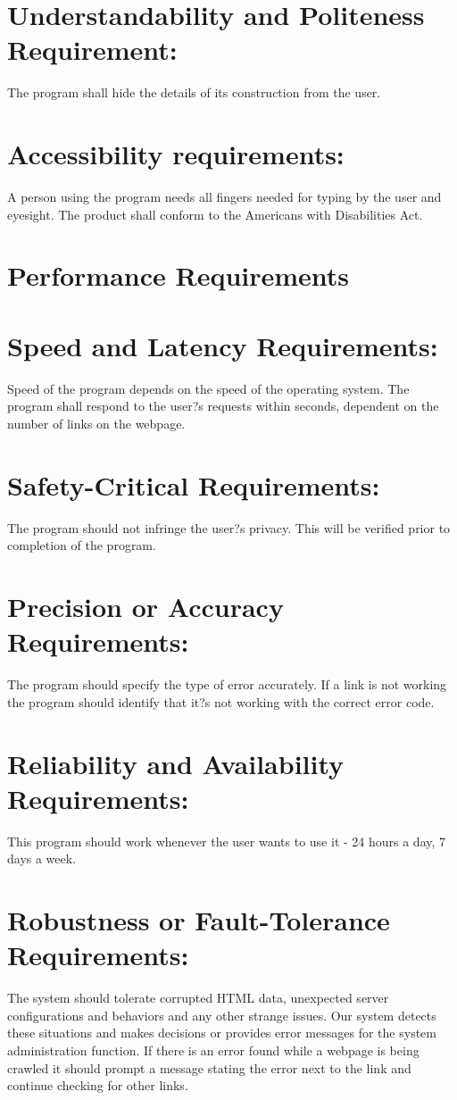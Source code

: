 \documentclass[12pt]{article}
\begin{document}
\section*{Understandability and Politeness Requirement: }The program shall hide the details of its construction from the user.

\section*{Accessibility requirements:} A person using the program needs all fingers needed for typing by the user and eyesight. The product shall conform to the Americans with Disabilities Act.

\section*{Performance Requirements }

\section*{Speed and Latency Requirements:}
Speed of the program depends on the speed of the operating system. The program shall respond to the user?s requests within seconds, dependent on the number of links on the webpage. 

\section*{Safety-Critical Requirements: }The program should not infringe the user?s privacy. 
This will be verified prior to completion of the program.



\section*{Precision or Accuracy Requirements:}
The program should specify the type of error accurately. If a link is not working the program should identify that it?s not working with the correct error code.

\section*{Reliability and Availability Requirements:}

This program should work whenever the user wants to use it - 24 hours a day, 7 days a week.

\section*{Robustness or Fault-Tolerance Requirements:}
The system should tolerate corrupted HTML data, unexpected server configurations and behaviors and any other strange issues. Our system detects these situations and makes decisions or provides error messages for the system administration function.
If there is an error found while a webpage is being crawled it should prompt a message stating the error next to the link and continue checking for other links.
\end{document}
